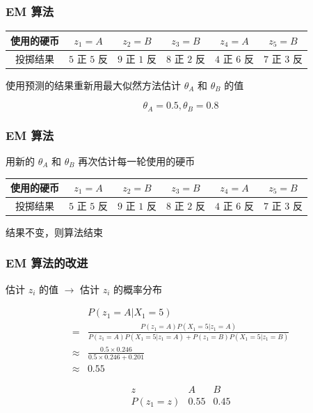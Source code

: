 \documentclass{beamer}
\newcommand{\Gh}{\theta}
\begin{document}
\begin{frame}
    \frametitle{EM 算法}

    \begin{table}
        \begin{tabular}{c|c|c|c|c|c}
            使用的硬币 & $z_1 = A$ & $z_2 = B$ & $z_3 = B$ & $z_4 = A$ & $z_5 = B$ \\\hline
            投掷结果 & $5$ 正 $5$ 反 & $9$ 正 $1$ 反 & $8$ 正 $2$ 反 & $4$ 正 $6$ 反 & $7$ 正 $3$ 反
        \end{tabular}
    \end{table}

    使用预测的结果重新用最大似然方法估计 $\Gh_A$ 和 $\Gh_B$ 的值

    \[\Gh_A = 0.5, \Gh_B = 0.8\]

\end{frame}

\begin{frame}
    \frametitle{EM 算法}

    用新的 $\Gh_A$ 和 $\Gh_B$ 再次估计每一轮使用的硬币

    \begin{table}
        \begin{tabular}{c|c|c|c|c|c}
            使用的硬币 & $z_1 = A$ & $z_2 = B$ & $z_3 = B$ & $z_4 = A$ & $z_5 = B$ \\\hline
            投掷结果 & $5$ 正 $5$ 反 & $9$ 正 $1$ 反 & $8$ 正 $2$ 反 & $4$ 正 $6$ 反 & $7$ 正 $3$ 反
        \end{tabular}
\end{table}

    结果不变，则算法结束

\end{frame}

\begin{frame}
    \frametitle{EM 算法的改进}

    估计 $z_i$ 的值 $\rightarrow$ 估计 $z_i$ 的概率分布

    \pause

    \[\begin{split}
        & P(z_1 = A \vert X_1 = 5) \\
        = & \frac{P(z_1 = A)P(X_1 = 5 \vert z_1 = A)}{P(z_1 = A)P(X_1 = 5 \vert z_1 = A) + P(z_1 = B)P(X_1 = 5 \vert z_1 = B)} \\
        \approx & \frac{0.5\times 0.246}{0.5\times 0.246 + 0.201} \\
        \approx & 0.55
    \end{split}\]

    \[\begin{array}{c|c|c}
        z & A & B \\\hline
        P(z_1 = z) & 0.55 & 0.45
    \end{array}\]

\end{frame}
\end{document}
